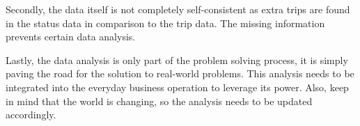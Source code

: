 \documentclass[a4paper]{article}
\begin{document}
	Secondly, the data itself is not completely self-consistent as extra trips are found in the status data in comparison to the trip data. The missing information prevents certain data analysis. 
	
	Lastly, the data analysis is only part of the problem solving process, it is simply paving the road for the solution to real-world problems. This analysis needs to be integrated into the everyday business operation to leverage its power. Also, keep in mind that the world is changing, so the analysis needs to be updated accordingly.
			
\clearpage										
		
	\begin{appendix}
		\listoffigures
	\end{appendix}
	
\end{document}
